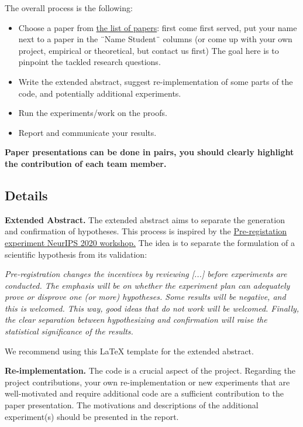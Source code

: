 \documentclass{article}
\begin{document}
The overall process is the following:
\begin{itemize}
    \item Choose a paper from \href{https://docs.google.com/spreadsheets/d/16m-sXLK4lC5WoI5rNj5VY1BBDEIMi2mPbnrz0Ys7EsU/edit?gid=0#gid=0}{the list of papers}: first come first served, put your name next to a paper in the ¨Name Student¨ columns (or come up with your own project, empirical or theoretical, but contact us first)
    The goal here is to pinpoint the tackled research questions.
    \item Write the extended abstract, suggest re-implementation of some parts of the code, and potentially additional experiments.  
    \item Run the experiments/work on the proofs.
    \item Report and communicate your results.
\end{itemize}


\textbf{Paper presentations can be done in pairs, you should clearly highlight the contribution of each team member.}



\subsection{Details}

\textbf{Extended Abstract.} 
The extended abstract aims to separate the generation and confirmation of hypotheses. This process is inspired by the \href{https://preregister.science/}{Pre-registation experiment NeurIPS 2020 workshop.} The idea is to separate the formulation of a scientific hypothesis from its validation: 
\begin{center}
\begin{minipage}{ .9\textwidth}
\emph{Pre-registration changes the incentives by reviewing [...] before experiments are conducted. The emphasis will be on whether the experiment plan can adequately prove or disprove one (or more) hypotheses. Some results will be negative, and this is welcomed. This way, good ideas that do not work will be welcomed. Finally, the clear separation between hypothesizing and confirmation will raise the statistical significance of the results.}
\end{minipage}
\end{center}
We recommend using this LaTeX template for the extended abstract.

\textbf{Re-implementation.}
The code is a crucial aspect of the project.
Regarding the project contributions, your own re-implementation or new experiments that are well-motivated and require additional code are a sufficient contribution to the paper presentation. The motivations and descriptions of the additional experiment(s) should be presented in the report. 
\end{document}
